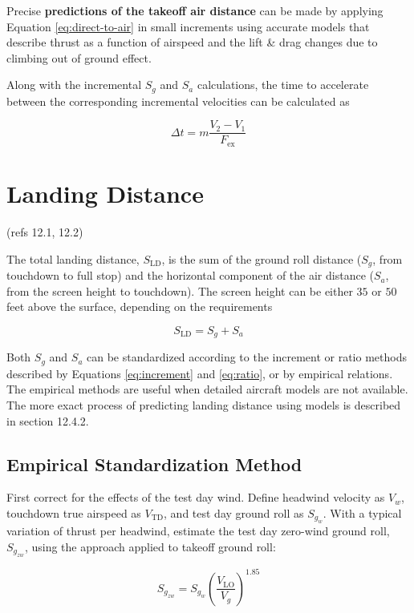 \documentclass[
]{book}
\begin{document}
Precise \textbf{predictions of the takeoff air distance} can be made by applying Equation \eqref{eq:direct-to-air} in small increments using accurate models that describe thrust as a function of airspeed and the lift \& drag changes due to climbing out of ground effect.

Along with the incremental \(S_g\) and \(S_a\) calculations, the time to accelerate between the corresponding incremental velocities can be calculated as

\[
\Delta t = m \frac{V_2 - V_1}{F_{\text{ex}}}
\]

\hypertarget{landing-distance}{%
\section{Landing Distance}\label{landing-distance}}

(refs 12.1, 12.2)

The total landing distance, \(S_{\mathrm{LD}}\), is the sum of the ground roll distance (\(S_g\), from touchdown to full stop) and the horizontal component of the air distance (\(S_a\), from the screen height to touchdown).
The screen height can be either \(35\) or \(50\) feet above the surface, depending on the requirements

\[
S_{\mathrm{LD}} = S_g + S_a
\]

Both \(S_g\) and \(S_a\) can be standardized according to the increment or ratio methods described by Equations \eqref{eq:increment} and \eqref{eq:ratio}, or by empirical relations.
The empirical methods are useful when detailed aircraft models are not available.
The more exact process of predicting landing distance using models is described in section 12.4.2.

\hypertarget{empirical-standardization-method-1}{%
\subsection{Empirical Standardization Method}\label{empirical-standardization-method-1}}

First correct for the effects of the test day wind.
Define headwind velocity as \(V_w\), touchdown true airspeed as \(V_{\mathrm{TD}}\), and test day ground roll as \(S_{g_w}\).
With a typical variation of thrust per headwind, estimate the test day zero-wind ground roll, \(S_{g_{zw}}\), using the approach applied to takeoff ground roll:

\[
S_{g_{zw}} = S_{g_w} \left( \frac{V_{\mathrm{LO}}}{V_g} \right)^{1.85}
\label{eq:emp-zero-wind-gnd-roll-dist-land}
\]
\end{document}

